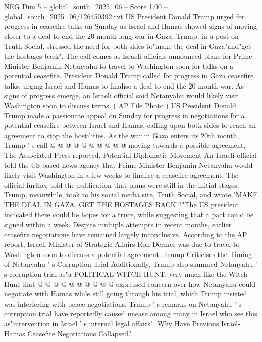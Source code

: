 \begin{textsample}{NEG Dim 5 – global\_south\_2025\_06 – Score 1.00 – global\_south\_2025\_06/126450392.txt}  \label{ex:f5_neg_394}
US President Donald Trump urged for progress in ceasefire talks on Sunday as Israel and Hamas showed signs of moving closer to a deal to end the 20-month-long war in Gaza.
Trump, in a post on Truth Social, stressed the need for both sides to"make the deal in Gaza"and"get the hostages back".
The call comes as Israeli officials announced plans for Prime Minister Benjamin Netanyahu to travel to Washington soon for talks on a potential ceasefire.
President Donald Trump called for progress in Gaza ceasefire talks, urging Israel and Hamas to finalise a deal to end the 20-month war.
As signs of progress emerge, an Israeli official said Netanyahu would likely visit Washington soon to discuss terms. ( AP File Photo ) US President Donald Trump made a passionate appeal on Sunday for progress in negotiations for a potential ceasefire between Israel and Hamas, calling upon both sides to reach an agreement to stop the hostilities.
As the war in Gaza enters its 20th month, Trump ' s call @ @ @ @ @ @ @ @ @ @ moving towards a possible agreement, The Associated Press reported.
Potential Diplomatic Movement An Israeli official told the US-based news agency that Prime Minister Benjamin Netanyahu would likely visit Washington in a few weeks to finalise a ceasefire agreement.
The official further told the publication that plans were still in the initial stages.
Trump, meanwhile, took to his social media site, Truth Social, and wrote,"MAKE THE DEAL IN GAZA.
GET THE HOSTAGES BACK!!!"The US president indicated there could be hopes for a truce, while suggesting that a pact could be signed within a week.
Despite multiple attempts in recent months, earlier ceasefire negotiations have remained largely inconclusive.
According to the AP report, Israeli Minister of Strategic Affairs Ron Dermer was due to travel to Washington soon to discuss a potential agreement.
Trump Criticises the Timing of Netanyahu ' s Corruption Trial Additionally, Trump also slammed Netanyahu ' s corruption trial as"a POLITICAL WITCH HUNT, very much like the Witch Hunt that @ @ @ @ @ @ @ @ @ @ expressed concern over how Netanyahu could negotiate with Hamas while still going through his trial, which Trump insisted was interfering with peace negotiations.
Trump ' s remarks on Netanyahu ' s corruption trial have reportedly caused unease among many in Israel who see this as"intervention in Israel ' s internal legal affairs".
Why Have Previous Israel-Hamas Ceasefire Negotiations Collapsed?

\end{textsample}

